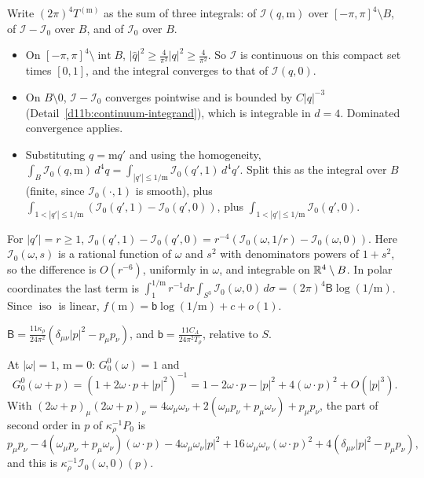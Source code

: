 \begin{step}
Write $(2\pi)^4T^{(\mathrm m)}$ as the sum of three integrals: of $\mathcal I(q,\mathrm m)$ over $[-\pi,\pi]^4\setminus B$, of $\mathcal I-\mathcal I_0$ over $B$, and of $\mathcal I_0$ over $B$.
\begin{itemize}
\item On $[-\pi,\pi]^4\setminus\operatorname{int}B$, $|\hat q|^2\ge\frac4{\pi^2}|q|^2\ge\frac4{\pi^2}$. So $\mathcal I$ is continuous on this compact set times $[0,1]$, and the integral converges to that of $\mathcal I(q,0)$.
\item On $B\setminus0$, $\mathcal I-\mathcal I_0$ converges pointwise and is bounded by $C|q|^{-3}$ (Detail~\ref{d11b:continuum-integrand}), which is integrable in $d=4$. Dominated convergence applies.
\item Substituting $q=\mathrm mq'$ and using the homogeneity, $\int_B\mathcal I_0(q,\mathrm m)\,d^4q=\int_{|q'|\le1/\mathrm m}\mathcal I_0(q',1)\,d^4q'$. Split this as the integral over $B$ (finite, since $\mathcal I_0(\cdot,1)$ is smooth), plus $\int_{1<|q'|\le1/\mathrm m}(\mathcal I_0(q',1)-\mathcal I_0(q',0))$, plus $\int_{1<|q'|\le1/\mathrm m}\mathcal I_0(q',0)$.
\end{itemize}
For $|q'|=r\ge1$, $\mathcal I_0(q',1)-\mathcal I_0(q',0)=r^{-4}(\mathcal I_0(\omega,1/r)-\mathcal I_0(\omega,0))$. Here $\mathcal I_0(\omega,s)$ is a rational function of $\omega$ and $s^2$ with denominators powers of $1+s^2$, so the difference is $O(r^{-6})$, uniformly in $\omega$, and integrable on $\mathbb R^4\setminus B$. In polar coordinates the last term is $\int_1^{1/\mathrm m}r^{-1}dr\int_{S^3}\mathcal I_0(\omega,0)\,d\sigma=(2\pi)^4\mathsf B\log(1/\mathrm m)$. Since $\operatorname{iso}$ is linear, $f(\mathrm m)=\mathsf b\log(1/\mathrm m)+c+o(1)$.
\end{step}

\begin{detail}\label{d11b:ol-classical}
$\mathsf B=\frac{11\kappa_\rho}{24\pi^2}(\delta_{\mu\nu}|p|^2-p_\mu p_\nu)$, and $\mathsf b=\frac{11C_A}{24\pi^2T_\rho}$, relative to $S$.
\end{detail}

\begin{step}
At $|\omega|=1$, $\mathrm m=0$: $G^0_0(\omega)=1$ and
\[
G^0_0(\omega+p)=(1+2\omega\cdot p+|p|^2)^{-1}=1-2\omega\cdot p-|p|^2+4(\omega\cdot p)^2+O(|p|^3).
\]
With $(2\omega+p)_\mu(2\omega+p)_\nu=4\omega_\mu\omega_\nu+2(\omega_\mu p_\nu+p_\mu\omega_\nu)+p_\mu p_\nu$, the part of second order in $p$ of $\kappa_\rho^{-1}P_0$ is
\[
p_\mu p_\nu-4(\omega_\mu p_\nu+p_\mu\omega_\nu)(\omega\cdot p)-4\omega_\mu\omega_\nu|p|^2+16\,\omega_\mu\omega_\nu(\omega\cdot p)^2+4(\delta_{\mu\nu}|p|^2-p_\mu p_\nu),
\]
and this is $\kappa_\rho^{-1}\mathcal I_0(\omega,0)(p)$.
\end{step}

